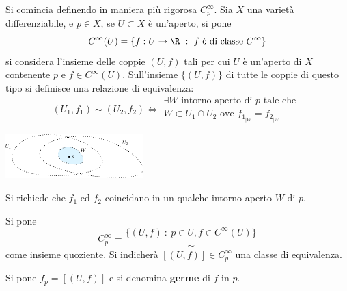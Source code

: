 \documentclass[10pt, letterpaper]{report}
\begin{document}
\noindent
Si comincia definendo in maniera più rigorosa $C^\infty_p$. Sia $X$ una varietà differenziabile, e $p\in X$, se $U\subset X$ è un'aperto, si pone\begin{equation}
    C^\infty(U)=\{f:U\rightarrow\R \ : \ f\text{ è di classe }C^\infty\}
\end{equation}
si considera l'insieme delle coppie $(U,f)$ tali per cui $U$ è un'aperto di $X$ contenente $p$ e $f\in C^\infty(U)$. Sull'insieme $\{(U,f)\}$ di tutte le coppie di questo tipo si definisce una relazione di equivalenza:\begin{equation}
    (U_1,f_1)\sim (U_2,f_2)\iff \begin{matrix}
        \exists W\text{ intorno aperto di }p\text{ tale che }\\W\subset U_1\cap U_2\text{ ove }f_{1_{|W}}=f_{2_{|W}}
    \end{matrix}
\end{equation}\begin{center}
    \includegraphics[width=0.4\textwidth ]{images/relazione_C.eps}
\end{center}
Si richiede che $f_1$ ed $f_2$ coincidano in un qualche intorno aperto $W$ di $p$.
\begin{definizione}
    Si pone\begin{equation}
        C_p^\infty=\frac{\{(U,f) \ : \ p\in U, f\in C^\infty(U)\}}{\sim}
    \end{equation}
    come insieme quoziente. Si indicherà $[(U,f)]\in  C_p^\infty$ una classe di equivalenza.
\end{definizione}
Si pone $f_p=[(U,f)]$ e si denomina \textbf{germe} di $f$ in $p$.
\end{document}
